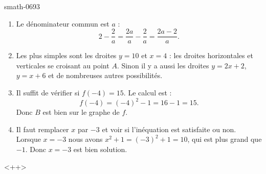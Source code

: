 
\begin{corrige}{smath-0693}

    \begin{enumerate}
        \item
            Le dénominateur commun est \( a\) :
            \begin{equation}
                2-\frac{ 2 }{ a }=\frac{ 2a }{ a }-\frac{ 2 }{ a }=\frac{ 2a-2 }{ a }.
            \end{equation}
        \item
            Les plus simples sont les droites \( y=10\) et \( x=4\) :  les droites horizontales et verticales se croisant au point \( A\). Sinon il y a aussi les droites \( y=2x+2\), \( y=x+6\) et de nombreuses autres possibilités.
        \item
            Il suffit de vérifier si \( f(-4)=15\). Le calcul est :
            \begin{equation}
                f(-4)=(-4)^2-1=16-1=15.
            \end{equation}
            Donc \( B\) est bien sur le graphe de \( f\).
        \item
            Il faut remplacer \( x\) par \( -3\) et voir si l'inéquation est satisfaite ou non. Lorsque \( x=-3\) nous avons \( x^2+1=(-3)^2+1=10\), qui est plus grand que \( -1\). Donc \( x=-3\) est bien solution.
    \end{enumerate}
    <++>

\end{corrige}

